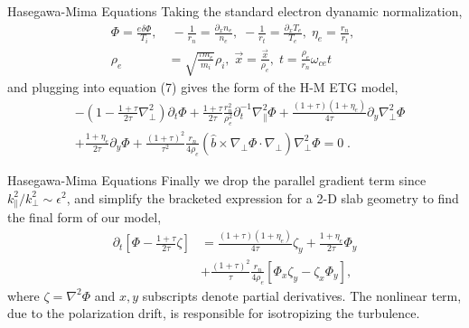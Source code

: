 \documentclass[aspectratio=43]{beamer}
\begin{document}
   \begin{frame}{Hasegawa-Mima Equations}
      \quad Taking the standard electron dyanamic normalization,
      \begin{equation}
      \begin{aligned}
         \Phi    = \frac{e\delta\Phi}{T_i},&\; -\frac{1}{r_n}=\frac{\partial_x n_e}{n_e},\; -\frac{1}{r_t}=\frac{\partial_x T_e}{T_e},\; \eta_e=\frac{r_n}{r_t},\; \\
         \rho_e &= \sqrt{\frac{\tau m_e}{m_i}}\rho_i,\; \vec{x} = \frac{\vec{x}}{\rho_e},\; t=\frac{\rho_e}{r_n}\omega_{ce}t
      \end{aligned}
      \end{equation}
   and plugging into equation (7) gives the form of the H-M ETG model,
      \begin{equation}
      \begin{aligned}
         &-(1-\frac{1+\tau}{2\tau}\nabla_{\perp}^2)\partial_t\Phi + \frac{1+\tau}{2\tau}\frac{r_n^2}{\rho_e^2}\partial_t^{-1}\nabla_{\parallel}^2\Phi
          + \frac{(1+\tau)(1+\eta_e)}{4\tau}\partial_y\nabla_{\perp}^2\Phi \\
         &+ \frac{1+\eta_e}{2\tau}\partial_y\Phi + \frac{(1+\tau)^2}{\tau^2}\frac{r_n}{4\rho_e}(\hat{b}\times\nabla_{\perp}\Phi\cdot\nabla_{\perp})\nabla_{\perp}^2\Phi = 0\;.
      \end{aligned}
      \end{equation}
   \end{frame}

   \begin{frame}{Hasegawa-Mima Equations}
      \quad Finally we drop the parallel gradient term since $k_{\parallel}^2/k_{\perp}^2 \sim \epsilon^2$, and simplify the bracketed expression for a 2-D slab geometry to find the final
   form of our model,
      \begin{equation}
      \begin{aligned}
         \partial_t[\Phi-\frac{1+\tau}{2\tau}\zeta] &= \frac{(1+\tau)(1+\eta_e)}{4\tau}\zeta_y + \frac{1+\eta_e}{2\tau}\Phi_y \\
                                                    &+ \frac{(1+\tau)^2}{\tau}\frac{r_n}{4\rho_e}[\Phi_x\zeta_y-\zeta_x\Phi_y],
      \end{aligned}
      \end{equation}
   where $\zeta = \nabla^2\Phi$ and $x,y$ subscripts denote partial derivatives. The nonlinear term, due to the polarization drift, is responsible for isotropizing the turbulence.
   \end{frame}
\end{document}
